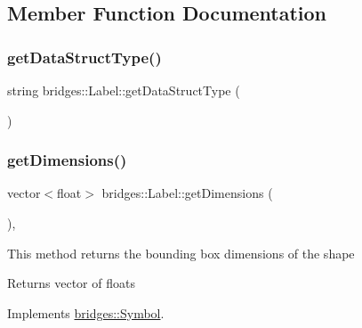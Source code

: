 \subsection{Member Function Documentation}
\mbox{\label{classbridges_1_1_label_a737053b6e94767959572f9985ea375c8}} 
\subsubsection{\texorpdfstring{get\+Data\+Struct\+Type()}{getDataStructType()}}
{\footnotesize\ttfamily string bridges\+::\+Label\+::get\+Data\+Struct\+Type (\begin{DoxyParamCaption}{ }\end{DoxyParamCaption})\hspace{0.3cm}{\ttfamily [inline]}}

\mbox{\label{classbridges_1_1_label_a97d5638f629edbd6733b8f8572ca42ba}} 
\subsubsection{\texorpdfstring{get\+Dimensions()}{getDimensions()}}
{\footnotesize\ttfamily vector$<$float$>$ bridges\+::\+Label\+::get\+Dimensions (\begin{DoxyParamCaption}{ }\end{DoxyParamCaption})\hspace{0.3cm}{\ttfamily [inline]}, {\ttfamily [virtual]}}

This method returns the bounding box dimensions of the shape

\begin{DoxyReturn}{Returns}
vector of floats 
\end{DoxyReturn}


Implements \mbox{\hyperlink{classbridges_1_1_symbol_a6eb190dc71b31b344b7610a07c6dc1d5}{bridges\+::\+Symbol}}.

\mbox{\label{classbridges_1_1_label_a630528ede3c5cc77548aeec886b92c1c}} 
